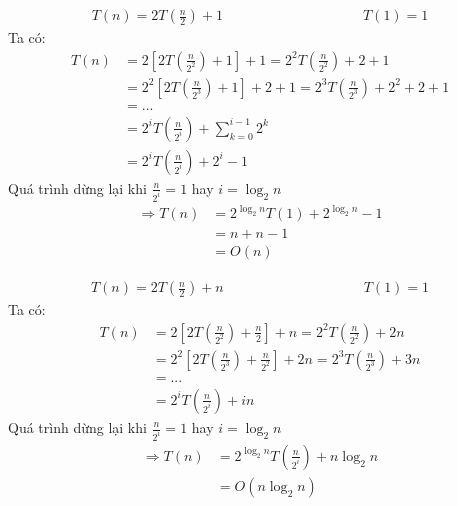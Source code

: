 \documentclass[12pt, a4paper, fleqn]{article}
\begin{document}
\begin{align*}
T(n) = 2T\left(\frac{n}{2}\right) + 1 \qquad\qquad\qquad\qquad\qquad T(1) = 1
\end{align*}
Ta có:
\begin{align*}
T(n) &= 2\left[2T\left(\frac{n}{2^2}\right)+1\right]+1=2^2T\left(\frac{n}{2^2}\right)+2+1\\
&=2^2\left[2T\left(\frac{n}{2^3}\right)+1\right]+2+1=2^3T\left(\frac{n}{2^3}\right)+2^2+2+1\\
&=...\\
&=2^iT\left(\frac{n}{2^i}\right)+{\sum_{k=0}^{i-1}2^k}\\
&=2^iT\left(\frac{n}{2^i}\right)+2^i-1
\end{align*}
Quá trình dừng lại khi $\displaystyle \frac{n}{2 ^ i} = 1$ hay $i = \log_{2}{n}$\\
\begin{align*}
\Rightarrow T(n) &= 2^{\log_{2}{n}}T(1)+2^{\log_{2}{n}}-1\\
&= n+n-1\\
&= O(n)
\end{align*}

\begin{align*}
T(n) = 2T\left(\frac{n}{2}\right) + n \qquad\qquad\qquad\qquad\qquad T(1) = 1
\end{align*}
Ta có:
\begin{align*}
T(n) &= 2\left[2T\left(\frac{n}{2^2}\right)+\frac{n}{2}\right]+n=2^2T\left(\frac{n}{2^2}\right)+2n\\
&=2^2\left[2T\left(\frac{n}{2^3}\right)+\frac{n}{2^2}\right]+2n=2^3T\left(\frac{n}{2^3}\right)+3n\\
&=...\\
&=2^iT\left(\frac{n}{2^i}\right)+in
\end{align*}
Quá trình dừng lại khi $\displaystyle \frac{n}{2 ^ i} = 1$ hay $i = \log_{2}{n}$\\
\begin{align*}
\Rightarrow T(n) &= 2^{\log_{2}{n}}T\left(\frac{n}{2^i}\right)+n\log_{2}{n}\\
&= O\left(n\log_{2}{n}\right)
\end{align*}
\end{document}
